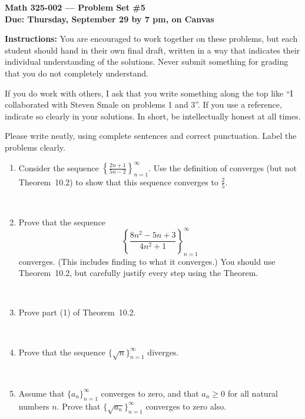 \documentclass{amsart}
\def\R{\mathbb R}
\def\ds{\displaystyle}
\begin{document}
\begin{center}
{\large\bfseries
Math 325-002 --- Problem Set \#5 \\
Due: Thursday, September 29 by 7 pm, on Canvas}
\end{center}





{\bf Instructions:} You are encouraged to work together on these
problems, but each student should hand in their own final draft,
written in a way that indicates their individual understanding of
the solutions. Never submit something for grading
that you do not completely understand. 

If you do work with others, I ask that you write something along the
top like ``I collaborated with Steven Smale on problems 1 and 3''.
If you use a reference, indicate so clearly in your solutions. 
In short, be intellectually
honest at all times.

Please write neatly, using complete sentences and correct
punctuation. Label the problems clearly. 






\begin{enumerate}

\item Consider the sequence $\ds \left\{ \frac{2n+1}{5n-2} \right\}_{n=1}^\infty$.
Use the definition of converges (but not Theorem~10.2) to show that this sequence converges to $\ds \frac{2}{5}$.

\

\item Prove that the sequence \[ \left\{ \frac{ 8 n^2 - 5n +3} {4 n^2 + 1} \right\}_{n=1}^\infty\]
converges. (This includes finding to what it converges.) You should use Theorem~10.2, but carefully justify every step using the Theorem.

\


\item Prove part (1) of Theorem~10.2.
 
 \

\item Prove that the sequence $\{\sqrt{n}\}_{n=1}^\infty$ diverges.

\

\item Assume that $\{a_n\}_{n=1}^\infty$ converges to zero, and that $a_n\geq 0$ for all natural numbers $n$. Prove that $\{ \sqrt{a_n}\}_{n=1}^\infty$ converges to zero also.






\end{enumerate}
\end{document}
